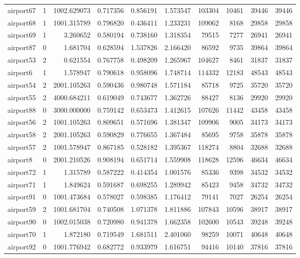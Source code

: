 \begin{longtable}{|l|r|r|r|r|r|r|r|r|r|}
airport67 & 1 & 1002.629073 & 0.717356 & 0.856191 & 1.573547 & 103304 & 10461 & 39446 & 39446 \\
airport68 & 1 & 1001.315789 & 0.796820 & 0.436411 & 1.233231 & 109062 & 8168 & 29858 & 29858 \\
airport69 & 1 & 3.260652 & 0.580194 & 0.738160 & 1.318354 & 79515 & 7277 & 26941 & 26941 \\
airport87 & 0 & 1.681704 & 0.628594 & 1.537826 & 2.166420 & 86592 & 9735 & 39864 & 39864 \\
airport53 & 2 & 0.621554 & 0.767758 & 0.498209 & 1.265967 & 104627 & 8461 & 31837 & 31837 \\
airport6 & 1 & 1.578947 & 0.790618 & 0.958096 & 1.748714 & 114332 & 12183 & 48543 & 48543 \\
airport54 & 2 & 2001.105263 & 0.590436 & 0.980748 & 1.571184 & 85718 & 9725 & 35720 & 35720 \\
airport55 & 2 & 4000.684211 & 0.619049 & 0.743677 & 1.362726 & 88427 & 8136 & 29920 & 29920 \\
airport88 & 0 & 3000.000000 & 0.759142 & 0.653473 & 1.412615 & 107626 & 11442 & 43458 & 43458 \\
airport56 & 2 & 1001.105263 & 0.809651 & 0.571696 & 1.381347 & 109906 & 9005 & 34173 & 34173 \\
airport58 & 2 & 2001.105263 & 0.590829 & 0.776655 & 1.367484 & 85695 & 9758 & 35878 & 35878 \\
airport57 & 2 & 1001.578947 & 0.867185 & 0.528182 & 1.395367 & 118274 & 8804 & 32688 & 32688 \\
airport8 & 0 & 2001.210526 & 0.908194 & 0.651714 & 1.559908 & 118628 & 12596 & 46634 & 46634 \\
airport72 & 1 & 1.315789 & 0.587222 & 0.414354 & 1.001576 & 85336 & 9398 & 34532 & 34532 \\
airport71 & 1 & 1.849624 & 0.591687 & 0.698255 & 1.289942 & 85423 & 9458 & 34732 & 34732 \\
airport91 & 0 & 1001.473684 & 0.578027 & 0.598385 & 1.176412 & 79141 & 7027 & 26254 & 26254 \\
airport59 & 2 & 1001.681704 & 0.740508 & 1.071378 & 1.811886 & 107843 & 10596 & 38917 & 38917 \\
airport90 & 0 & 1002.015038 & 0.720980 & 0.941378 & 1.662358 & 102600 & 10543 & 39248 & 39248 \\
airport70 & 1 & 1.872180 & 0.719549 & 1.681511 & 2.401060 & 98259 & 10071 & 40648 & 40648 \\
airport92 & 0 & 1001.776942 & 0.682772 & 0.933979 & 1.616751 & 94416 & 10140 & 37816 & 37816 \\

\end{longtable}
